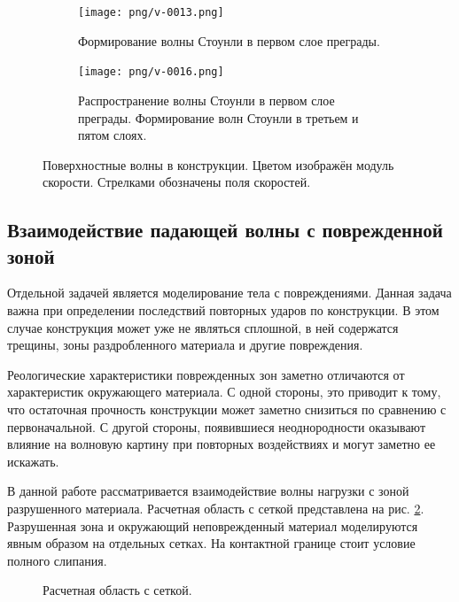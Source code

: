 \begin{figure}[htp]
\begin{subfigure}[b]{\textwidth}
\centering
\texttt{[image: png/v-0013.png]}
\caption{Формирование волны Стоунли в первом слое преграды.}
\end{subfigure}
\begin{subfigure}[b]{\textwidth}
\centering
\texttt{[image: png/v-0016.png]}
\caption{Распространение волны Стоунли в первом слое преграды. Формирование волн Стоунли в третьем и пятом слоях.}
\end{subfigure}
\caption{Поверхностные волны в конструкции. Цветом изображён модуль скорости. Стрелками обозначены поля скоростей.}
\label{pic:multilayer_Rayleigh}
\end{figure}


\clearpage
\newpage


\subsection{Взаимодействие падающей волны с поврежденной зоной}

Отдельной задачей является моделирование тела с повреждениями. Данная задача важна при определении последствий повторных ударов по конструкции. В этом случае конструкция может уже не являться сплошной, в ней содержатся трещины, зоны раздробленного материала и другие повреждения.

Реологические характеристики поврежденных зон заметно отличаются от характеристик окружающего материала. С одной стороны, это приводит к тому, что остаточная прочность конструкции может заметно снизиться по сравнению с первоначальной. С другой стороны, появившиеся неоднородности оказывают влияние на волновую картину при повторных воздействиях и могут заметно ее искажать.

В данной работе рассматривается взаимодействие волны нагрузки с зоной разрушенного материала. Расчетная область с сеткой представлена на рис. \ref{pic:crack_mesh}. Разрушенная зона и окружающий неповрежденный материал моделируются явным образом на отдельных сетках. На контактной границе стоит условие полного слипания.

\begin{figure}[htp]
\caption{Расчетная область с сеткой.}
\label{pic:crack_mesh}
\end{figure}

